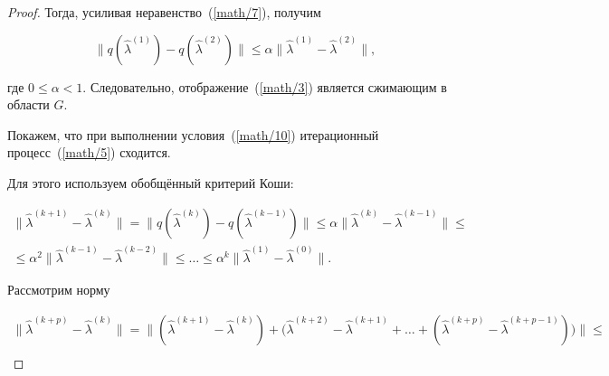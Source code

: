 \begin{proof}
Тогда,  усиливая неравенство~(\ref{math/7}),  получим

    \begin{equation}

        \label{math/10}

        \bigl\|q( \hat{\lambda}^{( 1 ) } ) -q( \hat{\lambda}^{( 2 ) } ) \bigr\|\leq \alpha \bigl\|\hat{\lambda}^{( 1 ) }-\hat{\lambda}^{( 2 ) }\bigr\|, 

    \end{equation}

    где $0\leq\alpha<1 $. Следовательно,  отображение~(\ref{math/3}) является сжимающим в области  $G$.



Покажем,  что при выполнении условия~(\ref{math/10})  итерационный процесс~(\ref{math/5}) сходится. 

Для этого используем обобщённый критерий Коши:

\begin{multline}

\label{math/11}

\bigl\|\hat{\lambda}^{( k+1 ) }-\hat{\lambda}^{( k ) }\bigr\|=

\bigl\|q( \hat{\lambda}^{( k ) } ) -q( \hat{\lambda}^{( k-1 ) } ) \bigr\|\leq 

\alpha \bigl\|\hat{\lambda}^{( k ) }-\hat{\lambda}^{( k-1 ) }\bigr\| \leq \\

\leq \alpha ^2\bigl\|\hat{\lambda}^{( k-1 ) }-\hat{\lambda}^{( k-2 ) }\bigr\|\leq 

\ldots 

\leq 

\alpha ^k\bigl\|\hat{\lambda}^{( 1 ) }-\hat{\lambda}^{( 0 ) }\bigr\|.

\end{multline}



Рассмотрим норму

\begin{multline}

\label{math/12}

\bigl\|\hat{\lambda}^{( k+p ) }-\hat{\lambda}^{( k ) }\bigr\|

=

\bigl\|( \hat{\lambda}^{( k+1 ) }-\hat{\lambda}^{( k ) } ) + \bigl( \hat{\lambda}^{( k+2 ) }-\hat{\lambda}^{( k+1 ) }+\ldots +( \hat{\lambda}^{( k+p ) }-\hat{\lambda}^{( k+p-1 ) } )  \bigr) \bigr\|\leq \\ 


\end{multline}
\end{proof}
